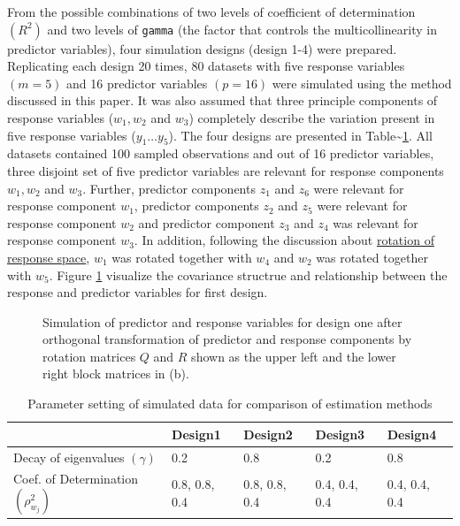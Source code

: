 \documentclass[3p,times,12pt,authoryear]{elsarticle}
\theoremstyle{definition}
\theoremstyle{definition}
\theoremstyle{remark}
\begin{document}
From the possible combinations of two levels of coefficient of
determination \((R^2)\) and two levels of \texttt{gamma} (the factor
that controls the multicollinearity in predictor variables), four
simulation designs (design 1-4) were prepared. Replicating each design
20 times, 80 datasets with five response variables \((m=5)\) and 16
predictor variables \((p = 16)\) were simulated using the method
discussed in this paper. It was also assumed that three principle
components of response variables (\(w_1, w_2\) and \(w_3\)) completely
describe the variation present in five response variables
(\(y_1 \ldots y_5\)). The four designs are presented in
Table\textasciitilde{}\ref{tab:parameter-settings}. All datasets
contained 100 sampled observations and out of 16 predictor variables,
three disjoint set of five predictor variables are relevant for response
components \(w_1, w_2\) and \(w_3\). Further, predictor components
\(z_1\) and \(z_6\) were relevant for response component \(w_1\),
predictor components \(z_2\) and \(z_5\) were relevant for response
component \(w_2\) and predictor component \(z_3\) and \(z_4\) was
relevant for response component \(w_3\). In addition, following the
discussion about \protect\hyperlink{rotation-of-response-space}{rotation
of response space}, \(w_1\) was rotated together with \(w_4\) and
\(w_2\) was rotated together with \(w_5\). Figure
\ref{fig:cov-plot-print-1} visualize the covariance structrue and
relationship between the response and predictor variables for first
design.

\begin{figure}[!htb]
\caption{Simulation of predictor and response variables for design one after orthogonal transformation of predictor and response components by rotation matrices $Q$ and $R$ shown as the upper left and the lower right block matrices in (b).}\label{fig:cov-plot-print-1}
\end{figure}

\begin{table}[!h]

\caption{\label{tab:parameter-settings}Parameter setting of simulated data for comparison of estimation methods}
\centering
\begin{tabular}[t]{p{}p{}p{}p{}p{}}
\toprule
  & Design1 & Design2 & Design3 & Design4\\
\midrule
Decay of eigenvalues $(\gamma)$ & 0.2 & 0.8 & 0.2 & 0.8\\
Coef. of Determination $(\rho^2_{w_j})$ & 0.8, 0.8, 0.4 & 0.8, 0.8, 0.4 & 0.4, 0.4, 0.4 & 0.4, 0.4, 0.4\\
\bottomrule
\end{tabular}
\end{table}
\end{document}
